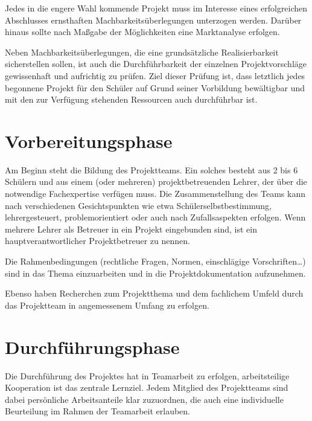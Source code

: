 Jedes in die engere Wahl kommende Projekt muss im Interesse eines erfolgreichen Abschlusses ernsthaften Machbarkeitsüberlegungen unterzogen werden. Darüber hinaus sollte nach Maßgabe der Möglichkeiten eine Marktanalyse erfolgen.

Neben Machbarkeitsüberlegungen, die eine grundsätzliche Realisierbarkeit sicherstellen sollen, ist auch die Durchführbarkeit der einzelnen Projektvorschläge gewissenhaft und aufrichtig zu prüfen. Ziel dieser Prüfung ist, dass letztlich jedes begonnene Projekt für den Schüler auf Grund seiner Vorbildung bewältigbar und mit den zur Verfügung stehenden Ressourcen auch durchführbar ist.

\section{Vorbereitungsphase}

Am Beginn steht die Bildung des Projektteams. Ein solches besteht aus 2 bis 6 Schülern und aus einem (oder mehreren) projektbetreuenden Lehrer, der über die notwendige Fachexpertise verfügen muss. Die Zusammenstellung des Teams kann nach verschiedenen Gesichtspunkten wie etwa Schülerselbstbestimmung, lehrergesteuert, problemorientiert oder auch nach Zufallsaspekten erfolgen. Wenn mehrere Lehrer als Betreuer in ein Projekt eingebunden sind, ist ein hauptverantwortlicher Projektbetreuer zu nennen.

Die Rahmenbedingungen (rechtliche Fragen, Normen, einschlägige Vorschriften…) sind in das Thema einzuarbeiten und in die Projektdokumentation aufzunehmen.

Ebenso haben Recherchen zum Projektthema und dem fachlichem Umfeld durch das Projektteam in angemessenem Umfang zu erfolgen.

\section{Durchführungsphase}

Die Durchführung des Projektes hat in Teamarbeit zu erfolgen, arbeitsteilige Kooperation ist das zentrale Lernziel. Jedem Mitglied des Projektteams sind dabei persönliche Arbeitsanteile klar zuzuordnen, die auch eine individuelle Beurteilung im Rahmen der Teamarbeit erlauben.

